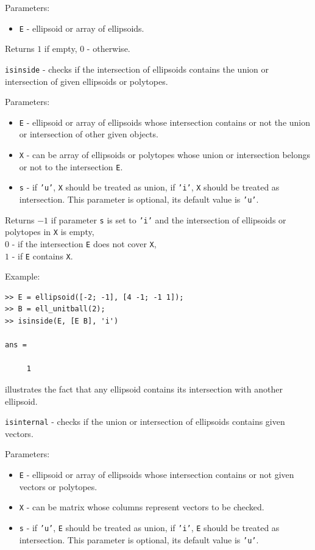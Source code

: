 \documentclass{report}
\begin{document}
Parameters:
\begin{itemize}
\item {\tt E} - ellipsoid or array of ellipsoids.
\end{itemize}

Returns $1$ if empty, $0$ - otherwise.

\newpage

{\Large {\tt isinside}} - checks if the intersection of ellipsoids contains
the union or intersection of given ellipsoids or polytopes.

Parameters:
\begin{itemize}
\item {\tt E} - ellipsoid or array of ellipsoids whose intersection contains
or not the union or intersection of other given objects.
\item {\tt X} - can be array of ellipsoids or polytopes whose union or
intersection belongs or not to the intersection {\tt E}.
\item {\tt s} - if {\tt 'u'}, {\tt X} should be treated as union,
if {\tt 'i'}, {\tt X} should be treated as intersection. This parameter
is optional, its default value is {\tt 'u'}.
\end{itemize}

Returns $-1$ if parameter {\tt s} is set to {\tt 'i'} and the intersection
of ellipsoids or polytopes in {\tt X} is empty,\\
$0$ - if the intersection {\tt E} does not cover {\tt X},\\
$1$ - if {\tt E} contains {\tt X}.

Example:
{\tt \begin{verbatim}
>> E = ellipsoid([-2; -1], [4 -1; -1 1]);
>> B = ell_unitball(2);
>> isinside(E, [E B], 'i')

ans =

     1
\end{verbatim} }
illustrates the fact that any ellipsoid contains its intersection with
another ellipsoid.

\newpage

{\Large {\tt isinternal}} - checks if the union or intersection of ellipsoids
contains given vectors.

Parameters:
\begin{itemize}
\item {\tt E} - ellipsoid or array of ellipsoids whose intersection contains
or not given vectors or polytopes.
\item {\tt X} - can be matrix whose columns represent vectors to be checked.
\item {\tt s} - if {\tt 'u'}, {\tt E} should be treated as union,
if {\tt 'i'}, {\tt E} should be treated as intersection. This parameter
is optional, its default value is {\tt 'u'}.
\end{itemize}
\end{document}
